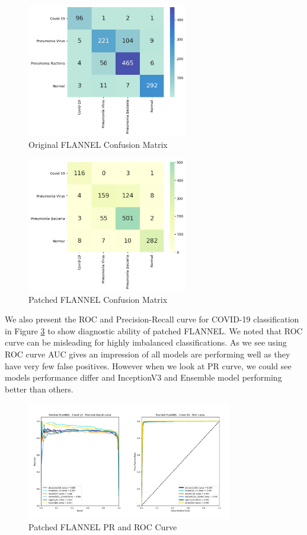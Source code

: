 \documentclass{sigkddExp}
\begin{document}
\begin{figure}[h]
    \centering
    \includegraphics[width=7cm]{../doc/images/base_flannel_cf.png}
    \caption{Original FLANNEL Confusion Matrix}
    \label{fig:f_cf}
\end{figure}


\begin{figure}[h]
    \centering
    \includegraphics[width=7cm]{../doc/images/patched_flannel_cf.png}
    \caption{Patched FLANNEL Confusion Matrix}
    \label{fig:p_cf}
\end{figure}


We also present the ROC and Precision-Recall curve for COVID-19 classification
in Figure \ref{fig:pf_roccurve} to show diagnostic ability of patched FLANNEL.
We noted that ROC curve can be misleading for highly imbalanced classifications.
As we see using ROC curve AUC gives an impression of all models are performing
well as they have very few false positives. However when we look at PR curve, we
could see models performance differ and InceptionV3 and Ensemble model
performing better than others.


\begin{figure}[h]
    \centering
    \includegraphics[width=0.8\textwidth]{../doc/images/patched_flannel_covid_19_plot_curve.png}
    \caption{Patched FLANNEL PR and ROC Curve}
    \label{fig:pf_roccurve}
\end{figure}
\end{document}
